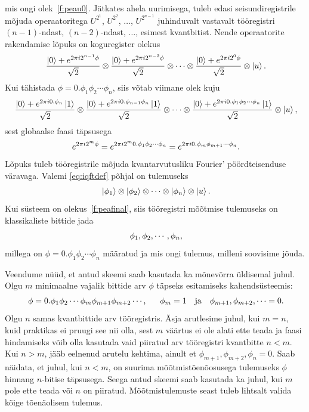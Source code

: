 \documentclass[12pt]{report}
\def\ket#1{\left|#1\right>}
\begin{document}
mis ongi olek~\eqref{f:peau0}.
Jätkates ahela uurimisega, tuleb edasi seisundiregistrile mõjuda operaatoritega \(U^{2^1}\), \(U^{2^2}\), \(\ldots\), \(U^{2^{n-1}}\) juhinduvalt vastavalt tööregistri \((n-1)\)-ndast, \((n-2)\)-ndast, \(\ldots\), esimest kvantbitist.
Nende operaatorite rakendamise lõpuks on koguregister olekus
\begin{align}\label{f:peauend}
    \frac{\ket{0}+ e^{2\pi i2^{n-1}\phi}}{\sqrt{2}}
    \otimes \frac{\ket{0}+ e^{2\pi i2^{n-2}\phi}}{\sqrt{2}}
    \otimes\cdots
    \otimes \frac{\ket{0}+ e^{2\pi i2^0\phi}}{\sqrt{2}}
    \otimes\ket{u} \rlap{.}
\end{align}
Kui tähistada \(\phi=0.\phi_1\phi_2\cdots\phi_n\), siis võtab viimane olek kuju
\begin{align}
    \frac{\ket{0}+ e^{2\pi i0.\phi_n}\ket{1}}{\sqrt{2}}
    \otimes \frac{\ket{0}+ e^{2\pi i0.\phi_{n-1}\phi_n}\ket{1}}{\sqrt{2}}
    \otimes\cdots
    \otimes \frac{\ket{0}+ e^{2\pi i0.\phi_1\phi_2\cdots\phi_n}\ket{1}}{\sqrt{2}}
    \otimes\ket{u} \rlap{,}
\end{align}
sest globaalse faasi täpsusega
\begin{align}
    e^{2\pi i2^m\phi}
    = e^{2\pi i2^m 0.\phi_1\phi_2\cdots\phi_n}
    = e^{2\pi i0.\phi_m\phi_{m+1}\cdots\phi_n} \rlap{.}
\end{align}
Lõpuks tuleb tööregistrile mõjuda kvantarvutusliku Fourier' pöördteisenduse väravaga.
Valemi \eqref{eq:iqftdef} põhjal on tulemuseks
\begin{align}\label{f:peafinal}
    \ket{\phi_1} \otimes \ket{\phi_2} \otimes \cdots \otimes \ket{\phi_n} \otimes \ket{u} \rlap{.}
\end{align}
Kui süsteem on olekus~\eqref{f:peafinal}, siis tööregistri mõõtmise tulemuseks on klassikaliste bittide jada
\begin{align}
    \phi_1, \phi_2, \cdots, \phi_n \rlap{,}
\end{align}
millega on \(\phi = 0.\phi_1\phi_2 \cdots \phi_n\) määratud ja mis ongi tulemus, milleni soovisime jõuda.

Veendume nüüd, et antud skeemi saab kasutada ka mõnevõrra üldisemal juhul.
Olgu \(m\) minimaalne vajalik bittide arv \(\phi\) täpseks esitamiseks kahendsüsteemis:
\begin{align}
   \phi=0.\phi_1\phi_2\cdots\phi_m\phi_{m+1}\phi_{m+2}\cdots \text{}
   \rlap{,} \qquad \phi_m = 1 \quad\text{ja}\quad \phi_{m+1}, \phi_{m+2}, \cdots = 0 \rlap{.}
\end{align}
Olgu \(n\) samas kvantbittide arv tööregistris.
Äsja arutlesime juhul, kui \(m = n\), kuid praktikas ei pruugi see nii olla, sest \(m\) väärtus ei ole alati ette teada ja faasi hindamiseks võib olla kasutada vaid piiratud arv tööregistri kvantbitte \(n < m\).
Kui \(n > m\), jääb eelnenud arutelu kehtima, ainult et \(\phi_{m+1}, \phi_{m+2}, \phi_n = 0\).
Saab näidata, et juhul, kui \(n < m\), on suurima mõõtmistõenõosusega tulemuseks \(\phi\) hinnang \(n\)-bitise täpsusega.
Seega antud skeemi saab kasutada ka juhul, kui \(m\) pole ette teada või \(n\) on piiratud.
Mõõtmis\-tulemuste seast tuleb lihtsalt 	valida kõige tõenäolisem tulemus.
\end{document}
